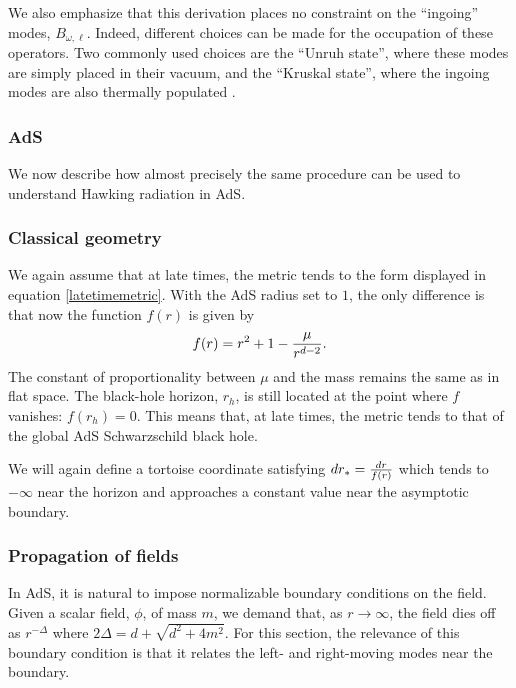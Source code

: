 \documentclass[12pt]{article}
\def\rtor{{r_*}}
\newcommand{\be}{\begin{equation}}
\newcommand{\ee}{\end{equation}}
\begin{document}
We also emphasize that this derivation places no constraint on the ``ingoing'' modes, $B_{\omega, \ell}$.  Indeed, different choices can be made for the occupation of these operators. Two commonly used choices are the ``Unruh state'', where these modes are simply placed in their vacuum, and the ``Kruskal state'', where the ingoing modes are also thermally populated \cite{Candelas:1980zt}.



\subsubsection{AdS \label{adshawkingderiv}}
We now describe how almost precisely the same procedure can be used to understand Hawking radiation in AdS.

\subsubsection*{Classical geometry }
We again assume that at late times, the metric tends to the form displayed in equation \eqref{latetimemetric}. With the AdS radius set to $1$, the only difference is that now the function $f(r)$ is given by
\be
\label{fadsexplicit}
f(r) = r^2 + 1 - {\mu \over r^{d-2}}.
\ee
The constant of proportionality between $\mu$ and the mass remains the same as in flat space. The black-hole horizon, $r_h$, is still located at the point where $f$ vanishes: $f(r_h) = 0$.  This means that, at late times, the metric tends to that of the global AdS Schwarzschild black hole.

We will again define a tortoise coordinate satisfying $d \rtor = {d r \over f(r)}$ which tends to $-\infty$ near the horizon and approaches a constant value near the asymptotic boundary.

\subsubsection*{Propagation of fields }
In AdS, it is natural to impose normalizable boundary conditions on the field. Given a scalar field, $\phi$, of mass $m$, we demand that, as $r \rightarrow \infty$, the field dies off as $r^{-\Delta}$ where $2 \Delta = d + \sqrt{d^2 + 4 m^2}$. For this section, the relevance of this boundary condition is that it relates the left- and right-moving modes near the boundary.
\end{document}

